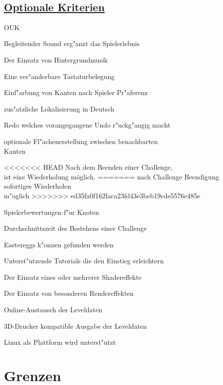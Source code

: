 ~\\


\subsection*{\underline{Optionale Kriterien}}

\begin{ids}{\gls{OUK}}


\id[10] Begleitender Sound erg{"a}nzt das Spielerlebnis

\id[20] Der Einsatz von Hintergrundmusik

\id[30] Eine ver{"a}nderbare Tastaturbelegung

\id[40] Einf{"a}rbung von Kanten nach Spieler Pr{"a}ferenz

\id[50] zus{"a}tzliche Lokalisierung in Deutsch

\id[60] Redo welches vorangegangene Undo r{"u}ckg{"a}ngig macht

\id[70] optionale Fl{"a}chenerstellung zwischen benachbarten \\Kanten

<<<<<<< HEAD
\id[80] Nach dem Beenden einer Challenge,\\ist eine Wiederholung möglich.
=======
\id[80] nach Challenge Beendigung sofortiges Wiederholen\\ m{"o}glich
>>>>>>> ed35fa0f162faca23fd43e3beb19cde5576e485e

\id[90] Spielerbewertungen f{"u}r Knoten

\id[100] Durchschnittszeit des Bestehens einer Challenge

\id[110] Eastereggs k{"o}nnen gefunden werden

\id[120] Unterst{"u}tzende Tutorials die den Einstieg erleichtern
	
\id[130] Der Einsatz eines oder mehrerer Shadereffekte

\id[140] Der Einsatz von besonderen Rendereffekten 

\id[150] Online-Austausch der Leveldaten

\id[160] 3D-Drucker kompatible Ausgabe der Leveldaten

\id[170] Linux als Plattform wird unterst{"u}tzt

\end{ids}


%
%
\clearpage


\section{Grenzen}
\label{UF:Grenzen}


